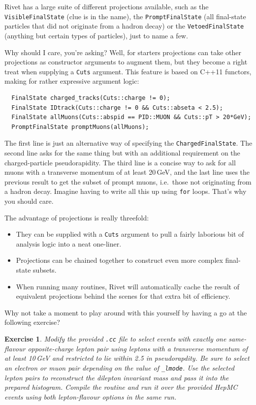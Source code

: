 \documentclass[10pt,fleqn]{scrartcl}
\theoremstyle{exstyle}
\newtheorem{exercise}{Exercise}
\begin{document}
Rivet has a large suite of different projections available,
such as the \verb|VisibleFinalState| (clue is in the name),
the \verb|PromptFinalState| (all final-state particles that 
did not originate from a hadron decay) 
or the \verb|VetoedFinalState| (anything but certain types of
particles), just to name a few. 

Why should I care, you're asking? 
Well, for starters projections can take other projections 
as constructor arguments to augment them, 
but they become a right treat when supplying
a \verb|Cuts| argument. This feature is based on C++11 functors, 
making for rather expressive argument logic:
\begin{verbatim}
  FinalState charged_tracks(Cuts::charge != 0);
  FinalState IDtrack(Cuts::charge != 0 && Cuts::abseta < 2.5);
  FinalState allMuons(Cuts::abspid == PID::MUON && Cuts::pT > 20*GeV);
  PromptFinalState promptMuons(allMuons);
\end{verbatim}
The first line is just an alternative way of specifying the
\verb|ChargedFinalState|. 
The second line asks for the same thing but with an additional
requirement on the charged-particle pseudorapidity.
The third line is a concise way to ask for all muons with a 
transverse momentum of at least 20\,GeV, and the last line 
uses the previous result to get the subset of prompt muons,
i.e.\ those not originating from a hadron decay.
Imagine having to write all this up using \verb|for| loops.
That's why you should care.

The advantage of projections is really threefold:
\begin{itemize}
\item They can be supplied with a \verb|Cuts| argument to pull a fairly laborious bit of analysis logic
      into a neat one-liner.
\item Projections can be chained together to construct even more complex final-state subsets.
\item When running many routines, Rivet will automatically cache the result of equivalent
      projections behind the scenes for that extra bit of efficiency.
\end{itemize}
Why not take a moment to play around with this yourself by having a go
at the following exercise?

\begin{exercise}
Modify the provided \verb|.cc| file to select events with exactly one same-flavour 
opposite-charge lepton pair using leptons with a transverse momentum of at least 10\,GeV 
and restricted to lie within 2.5 in pseudorapdity.
Be sure to select an electron or muon pair depending on the value of \verb|_lmode|.
Use the selected lepton pairs to reconstruct the dilepton invariant mass and 
pass it into the prepared histogram. Compile the routine and run it over
the provided HepMC events using both lepton-flavour options in the same run.
\end{exercise}
\end{document}
